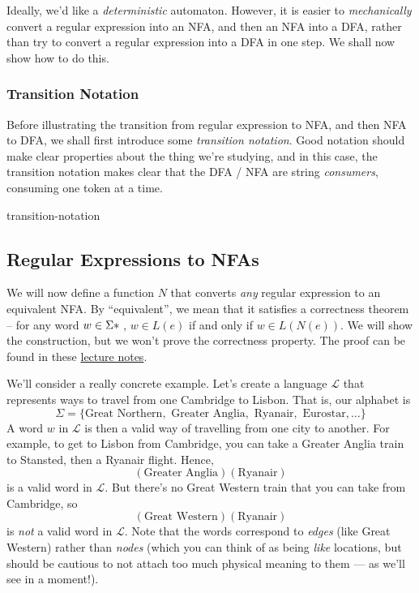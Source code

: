Ideally, we'd like a \emph{deterministic} automaton. However, it is easier to \emph{mechanically} convert a regular expression into an NFA, and then an NFA into a DFA, rather than try to convert a regular expression into a DFA in one step. We shall now show how to do this.

\subsubsection{Transition Notation}
Before illustrating the transition from regular expression to NFA, and then NFA to DFA, we shall first introduce some \emph{transition notation}. Good notation should make clear properties about the thing we're studying, and in this case, the transition notation makes clear that the DFA / NFA are string \emph{consumers}, consuming one token at a time. 

\begin{center}
    {transition-notation}
\end{center}

\subsection{Regular Expressions to NFAs}
We will now define a function $N$ that converts \textit{any} regular expression to an equivalent NFA. By ``equivalent'', we mean that it satisfies a correctness theorem -- for any word $w \in \Sigma\*$, $w \in L(e)$ if and only if $w \in L(N(e))$. We will show the construction, but we won't prove the correctness property. The proof can be found in these \href{https://courses.engr.illinois.edu/cs373/fa2013/Lectures/lec07.pdf}{lecture notes}.

We'll consider a really concrete example. Let's create a language $\mathcal{L}$ that represents ways to travel from one Cambridge to Lisbon. That is, our alphabet is 
\[ \Sigma = \{ \text{Great Northern}, \text{ Greater Anglia}, \text{ Ryanair}, \text{ Eurostar}, \ldots\} \]
A word $w$ in $\mathcal{L}$ is then a valid way of travelling from one city to another. For example, to get to Lisbon from Cambridge, you can take a Greater Anglia train to Stansted, then a Ryanair flight. Hence, 
\[(\text{Greater Anglia})(\text{Ryanair})\]
is a valid word in $\mathcal{L}$.
But there's no Great Western train that you can take from Cambridge, so 
\[(\text{Great Western})(\text{Ryanair})\]
is \textit{not} a valid word in $\mathcal{L}$. Note that the words correspond to \emph{edges} (like Great Western) rather than \emph{nodes} (which you can think of as being \emph{like} locations, but should be cautious to not attach too much physical meaning to them --- as we'll see in a moment!).

